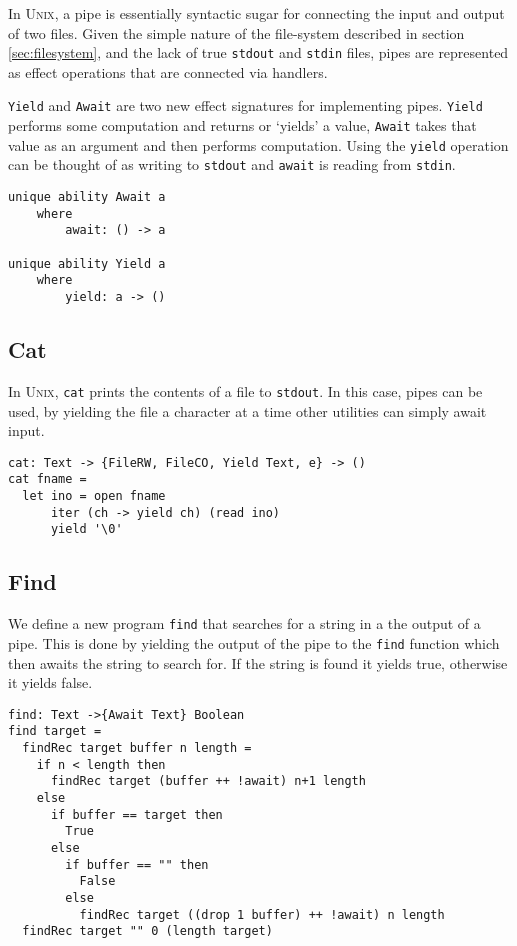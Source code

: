 \documentclass[logo,bsc,singlespacing,parskip]{infthesis}
\begin{document}
In \textsc{Unix}, a pipe is essentially syntactic sugar for connecting the input
and output of two files. Given the simple nature of the file-system described
in section \ref{sec:filesystem}, and the lack of true \texttt{stdout} and
\texttt{stdin} files, pipes are represented as effect operations that are
connected via handlers.

\texttt{Yield} and \texttt{Await} are two new effect signatures for
implementing pipes. \texttt{Yield} performs some computation and returns or
`yields' a value, \texttt{Await} takes that value as an argument and then
performs computation. Using the \texttt{yield} operation can be thought of as
writing to \texttt{stdout} and \texttt{await} is reading from \texttt{stdin}.

\begin{lstlisting}[language=unison]
unique ability Await a
    where
        await: () -> a

unique ability Yield a
    where
        yield: a -> ()
\end{lstlisting}

\subsection{Cat}
In \textsc{Unix}, \texttt{cat} prints the contents of a file to
\texttt{stdout}. In this case, pipes can be used, by yielding the file a
character at a time other utilities can simply await input.  

\begin{lstlisting}[language=unison]
cat: Text -> {FileRW, FileCO, Yield Text, e} -> ()
cat fname = 
  let ino = open fname
      iter (ch -> yield ch) (read ino)
      yield '\0'

\end{lstlisting}

\subsection{Find}

We define a new program \texttt{find} that searches for a string in a the output of a pipe. This is done by yielding the output of the pipe to the \texttt{find} function which then awaits the string to search for. If the string is found it yields true, otherwise it yields false.

\begin{lstlisting}[language=unison]
find: Text ->{Await Text} Boolean 
find target = 
  findRec target buffer n length =
    if n < length then
      findRec target (buffer ++ !await) n+1 length
    else 
      if buffer == target then
        True
      else 
        if buffer == "" then
          False
        else 
          findRec target ((drop 1 buffer) ++ !await) n length
  findRec target "" 0 (length target)

\end{lstlisting}
\end{document}
